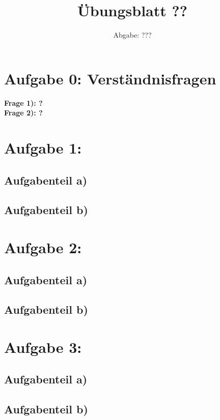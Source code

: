 

\subject{Computational Physics}
\title{Übungsblatt ??}
\date{%
  Abgabe: ???
}



\maketitle
\thispagestyle{empty}
\newpage

\section*{Aufgabe 0: Verständnisfragen}

\textbf{Frage 1): ?}\\

\textbf{Frage 2): ?}\\

\section*{Aufgabe 1: }

\subsection*{Aufgabenteil a)}

\subsection*{Aufgabenteil b)}

\section*{Aufgabe 2: }

\subsection*{Aufgabenteil a)}

\subsection*{Aufgabenteil b)}

\section*{Aufgabe 3: }

\subsection*{Aufgabenteil a)}

\subsection*{Aufgabenteil b)}



